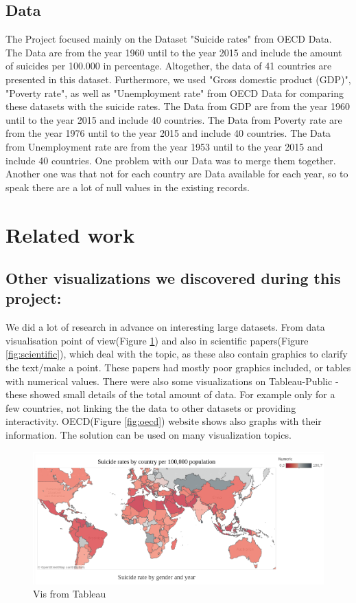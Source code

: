 \documentclass{vgtc}                          %
\begin{document}
\subsection{Data}

The Project focused mainly on the Dataset "Suicide rates" from OECD Data. The Data are from the year 1960 until to the year 2015 and include the amount of suicides per 100.000 in percentage. Altogether, the data of 41 countries are presented in this dataset. Furthermore, we used "Gross domestic product (GDP)", "Poverty rate", as well as "Unemployment rate" from OECD Data for comparing these datasets with the suicide rates.  The Data from GDP are from the year 1960 until to the year 2015 and include 40 countries. The Data from Poverty rate are from the year 1976 until to the year 2015 and include 40 countries. The Data from Unemployment rate are from the year 1953 until to the year 2015 and include 40 countries. One problem with our Data was to merge them together. Another one was that not for each country are Data available for each year, so to speak there are a lot of null values in the existing records.


\section{Related work}

\subsection{Other visualizations we discovered during this project:}

We did a lot of research in advance on interesting large datasets. From data visualisation point of view(Figure \ref{fig:tableau}) and also in scientific papers(Figure \ref{fig:scientific}), which deal with the topic, as these also contain graphics to clarify the text/make a point. These papers had mostly poor graphics included, or tables with numerical values. There were also some visualizations on Tableau-Public - these showed small details of the total amount of data. For example only for a few countries, not linking the the data to other datasets or providing interactivity. OECD(Figure \ref{fig:oecd}) website shows also graphs with their information. The solution can be used on many visualization topics.

\begin{figure}[tb]
\centering
\includegraphics[width=\columnwidth]{image/roman/researches.png}
\caption{Vis from Tableau}
\label{fig:tableau} 
\end{figure}
\end{document}
